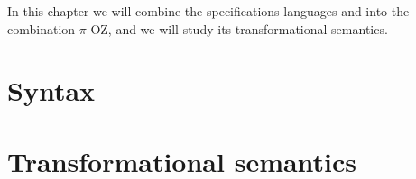 In this chapter we will combine the specifications languages \oz{} and \picalc{} into the combination $\pi$-OZ, and we will study its transformational semantics.
\section{Syntax}
\label{sec_comp_oz_pi_syntax}


\section{Transformational semantics}
\label{sec_comp_oz_pi_transformational_semantics}


